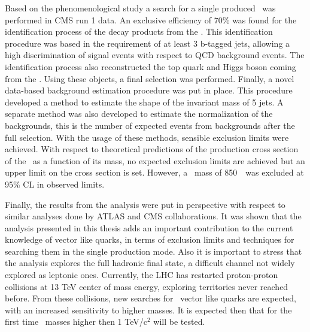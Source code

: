 Based on the phenomenological study a search for a single produced \Tp~was performed in CMS run 1 data. An exclusive efficiency of 70\% was found for the identification process of the decay products from the \Tp. This identification procedure was based in the requirement of at least 3 b-tagged jets, allowing a high discrimination of signal events with respect to QCD background events. The identification process also reconstructed the top quark and Higgs boson coming from the \Tp. Using these objects, a final selection was performed. Finally, a novel data-based background estimation procedure was put in place. This procedure developed a method to estimate the shape of the invariant mass of 5 jets. A separate method was also developed to estimate the normalization of the backgrounds, this is the number of expected events from backgrounds after the full selection. With the usage of these methods, sensible exclusion limits were achieved. With respect to theoretical predictions of the production cross section of the \Tp~as a function of its mass, no expected exclusion limits are achieved but an upper limit on the cross section is set. However, a \Tp~mass of 850~\GeVcc~was excluded at 95\% CL in observed limits.

Finally, the results from the analysis were put in perspective with respect to similar analyses done by ATLAS and CMS collaborations. It was shown that the analysis presented in this thesis adds an important contribution to the current knowledge of vector like quarks, in terms of exclusion limits and techniques for searching them in the single production mode. Also it is important to stress that the analysis explores the full hadronic final state, a difficult channel not widely explored as leptonic ones. Currently, the LHC has restarted proton-proton collisions at 13 TeV center of mass energy, exploring territories never reached before. From these collisions, new searches for \Tp~vector like quarks are expected, with an increased sensitivity to higher masses. It is expected then that for the first time \Tp~masses higher then 1 TeV/$\text{c}^{2}$ will be tested.
